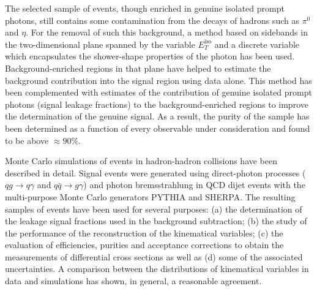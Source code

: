 \documentclass[12pt, twoside]{article}
\numberwithin{equation}{section}
\numberwithin{figure}{section}
\begin{document}
The selected sample of events, though enriched in genuine isolated prompt photons, still contains some contamination from the decays of hadrons such as $\pi^{0}$ and $\eta$. For the removal of such this background, a method based on sidebands in the two-dimensional plane spanned by the variable $E^{\text{iso}}_{T}$ and a discrete variable which encapsulates the shower-shape properties of the photon has been used. Background-enriched regions in that plane have helped to estimate the background contribution into the signal region using data alone. This method has been complemented with estimates of the contribution of genuine isolated prompt photons (signal leakage fractions) to the background-enriched regions to improve the determination of the genuine signal. As a result, the purity of the sample has been determined as a function of every observable under consideration and found to be above $\approx 90 \%$.

Monte Carlo simulations of events in hadron-hadron collisions have been described in detail. Signal events were generated using direct-photon processes ($q g \rightarrow q \gamma$ and $q \bar{q} \rightarrow g \gamma$) and photon bremsstrahlung in QCD dijet events with the multi-purpose Monte Carlo generators PYTHIA and SHERPA. The resulting samples of events have been used for several purposes: (a) the determination of the leakage signal fractions used in the background subtraction; (b) the study of the performance of the reconstruction of the kinematical variables; (c) the evaluation of efficiencies, purities and acceptance corrections to obtain the measurements of differential cross sections as well as (d) some of the associated uncertainties. A comparison between the distributions of kinematical variables in data and simulations has shown, in general, a reasonable agreement.
\end{document}
